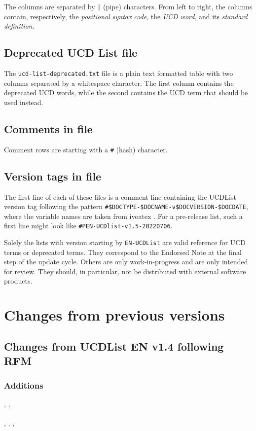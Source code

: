\documentclass[11pt,a4paper]{ivoa}
\begin{document}
The columns are separated by \texttt{|} (pipe) characters. From left to right, the 
columns contain, respectively, the \emph{positional syntax code}, the \emph{UCD word}, and its
\emph{standard definition}. 

\subsection{Deprecated UCD List file}
The \texttt{ucd-list-deprecated.txt} file is a plain text formatted table with two
columns separated by a whitespace character. The first column contains the deprecated 
UCD words, while the second contains the UCD term that should be used instead.

\subsection{Comments in file}

Comment rows are starting with a \texttt{\#} (hash) character.

\subsection{Version tags in file}

The first line of each of these files is a comment line containing the UCDList version 
tag following the pattern
\verb|#$DOCTYPE-$DOCNAME-v$DOCVERSION-$DOCDATE|, where the
variable names are taken from ivoatex \citep{ivoatexDoc}.  For a
pre-release list, such a first line might look like
\verb|#PEN-UCDlist-v1.5-20220706|.

Solely the lists with version starting by \texttt{EN-UCDList} are valid reference for UCD 
terms or deprecated terms. They correspond to the Endorsed Note at the final step of the 
update cycle. Others are only work-in-progress and are only intended
for review.   They should, in particular, not be distributed with
external software products.

\section{Changes from previous versions}
\subsection{Changes from UCDList EN v1.4 following RFM}
\subsubsection*{Additions}
, , \\
 \\
, , ,  \\
\end{document}
